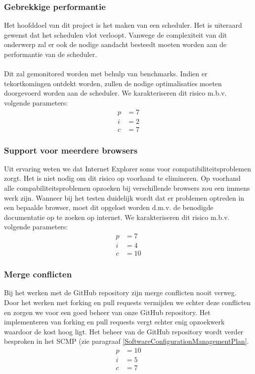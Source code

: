 \subsubsection{Gebrekkige performantie}
Het hoofddoel van dit project is het maken van een scheduler. Het is uiteraard gewenst dat het schedulen vlot verloopt. Vanwege de complexiteit van dit onderwerp zal er ook de nodige aandacht besteedt moeten worden aan de performantie van de scheduler.
\\
\\
Dit zal gemonitored worden met behulp van benchmarks. Indien er tekortkomingen ontdekt worden, zullen de nodige optimalisaties moeten doorgevoerd worden aan de scheduler. We karakteriseren dit risico m.b.v. volgende parameters:
\begin{align*}
	p &= 7\\
	i &= 2\\
	c &= 7
\end{align*}

\subsubsection{Support voor meerdere browsers}
Uit ervaring weten we dat Internet Explorer soms voor compatibiliteitsproblemen zorgt. Het is niet nodig om dit risico op voorhand te elimineren. Op voorhand alle compabiliteitsproblemen opzoeken bij verschillende browsers zou een immens werk zijn. Wanneer bij het testen duidelijk wordt dat er problemen optreden in een bepaalde browser, moet dit opgelost worden d.m.v. de benodigde documentatie op te zoeken op internet. We karakteriseren dit risico m.b.v. volgende parameters:
\begin{align*}
	p &= 7\\
	i &= 4\\
	c &= 10
\end{align*}

\subsubsection{Merge conflicten}
Bij het werken met de GitHub repository zijn merge conflicten nooit verweg. Door het werken met forking en pull requests vermijden we echter deze conflicten en zorgen we voor een goed beheer van onze GitHub repository. Het implementeren van forking en pull requests vergt echter enig opzoekwerk waardoor de kost hoog ligt. Het beheer van de GitHub repository wordt verder besproken in het SCMP (zie paragraaf \ref{SoftwareConfigurationManagementPlan}.
\begin{align*}
	p &= 10\\
	i &= 5\\
	c &= 7
\end{align*}

